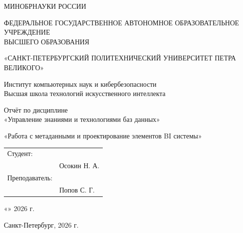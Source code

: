 \begin{titlepage}
\centering

{\small МИНОБРНАУКИ РОССИИ}

{\small ФЕДЕРАЛЬНОЕ ГОСУДАРСТВЕННОЕ АВТОНОМНОЕ ОБРАЗОВАТЕЛЬНОЕ УЧРЕЖДЕНИЕ\\ ВЫСШЕГО ОБРАЗОВАНИЯ}

{\small «САНКТ-ПЕТЕРБУРГСКИЙ ПОЛИТЕХНИЧЕСКИЙ УНИВЕРСИТЕТ ПЕТРА ВЕЛИКОГО»}

\vspace{1cm}

Институт компьютерных наук и кибербезопасности\\
Высшая школа технологий искусственного интеллекта

\vspace{3cm}

{\Large Отчёт по дисциплине\\ «Управление знаниями и технологиями баз данных»}

\vspace{0.5cm}

{\Large «Работа с метаданными и проектирование элементов BI системы»}

\vfill

\begin{flushright}
\begin{tabular}{l l}
Студент:        & \underline{\hspace{4cm}} \\
                & Осокин Н. А. \\[0.5cm]
Преподаватель:  & \underline{\hspace{4cm}} \\
                & Попов С. Г. \\
\end{tabular}
\end{flushright}

\vspace{1cm}

«\underline{\hspace{1cm}}» \underline{\hspace{3cm}} 2026 г.

\vspace{0.5cm}

Санкт-Петербург, 2026 г.

\end{titlepage}
